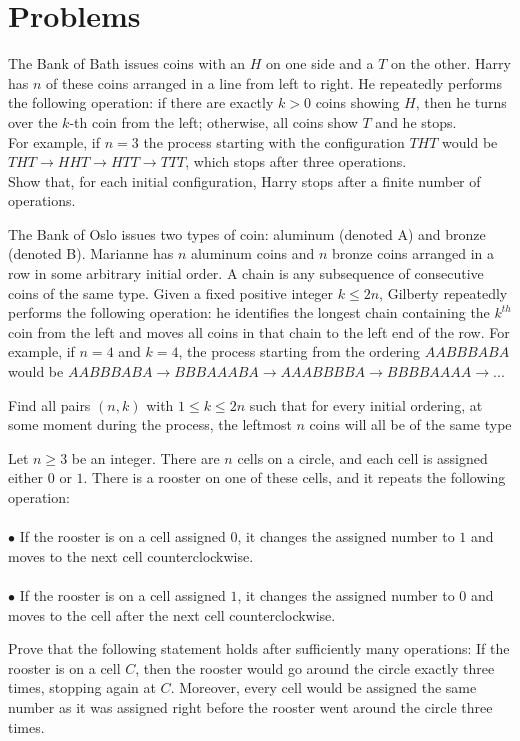 \section{Problems}
\begin{problem}[IMO 2019]
   The Bank of Bath issues coins with an $H$ on one side and a $T$ on the other. Harry has $n$ of these coins arranged in a line from left to right. He repeatedly performs the following operation: if there are exactly $k>0$ coins showing $H$, then he turns over the $k$-th coin from the left; otherwise, all coins show $T$ and he stops. \\ For example, if $n=3$ the process starting with the configuration $THT$ would be $THT \to HHT \to HTT \to TTT$, which stops after three operations. \\ Show that, for each initial configuration, Harry stops after a finite number of operations.
\end{problem} 
\begin{problem}[IMO 2022]
The Bank of Oslo issues two types of coin: aluminum (denoted A) and bronze (denoted B). Marianne has $n$ aluminum coins and $n$ bronze coins arranged in a row in some arbitrary initial order. A chain is any subsequence of consecutive coins of the same type. Given a fixed positive integer $k \leq 2n$, Gilberty repeatedly performs the following operation: he identifies the longest chain containing the $k^{th}$ coin from the left and moves all coins in that chain to the left end of the row. For example, if $n=4$ and $k=4$, the process starting from the ordering $AABBBABA$ would be $AABBBABA \to BBBAAABA \to AAABBBBA \to BBBBAAAA \to ...$

Find all pairs $(n,k)$ with $1 \leq k \leq 2n$ such that for every initial ordering, at some moment during the process, the leftmost $n$ coins will all be of the same type
\end{problem}
\begin{problem}[APMO 2025]
Let $n \geq 3$ be an integer. There are $n$ cells on a circle, and each cell is assigned either $0$ or $1$. There is a rooster on one of these cells, and it repeats the following operation:
\\\\
$\bullet$ If the rooster is on a cell assigned $0$, it changes the assigned number to $1$ and moves to the next cell counterclockwise.
\\\\
$\bullet$ If the rooster is on a cell assigned $1$, it changes the assigned number to $0$ and moves to the cell after the next cell counterclockwise.

Prove that the following statement holds after sufficiently many operations:
If the rooster is on a cell $C$, then the rooster would go around the circle exactly three times, stopping again at $C$. Moreover, every cell would be assigned the same number as it was assigned right before the rooster went around the circle three times.
\end{problem}
